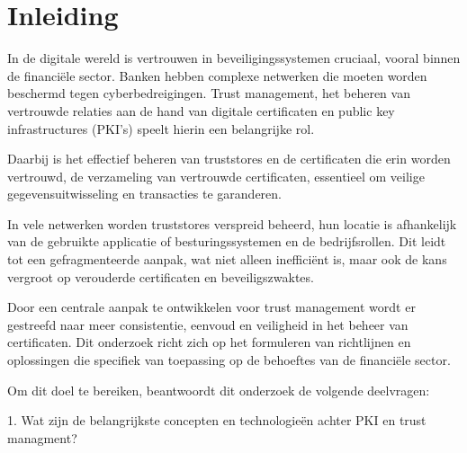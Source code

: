 


% 

\section{Inleiding}%
\label{sec:inleiding}

In de digitale wereld is vertrouwen in beveiligingssystemen cruciaal, vooral binnen de financiële sector. Banken hebben complexe netwerken die moeten worden beschermd tegen cyberbedreigingen. Trust management, het beheren van vertrouwde relaties aan de hand van digitale certificaten en public key infrastructures (PKI's) speelt hierin een belangrijke rol.

Daarbij is het effectief beheren van truststores en de certificaten die erin worden vertrouwd, de verzameling van vertrouwde certificaten, essentieel om veilige gegevensuitwisseling en transacties te garanderen.

In vele netwerken worden truststores verspreid beheerd, hun locatie is afhankelijk van de gebruikte applicatie of besturingssystemen en de bedrijfsrollen. Dit leidt tot een gefragmenteerde aanpak, wat niet alleen inefficiënt is, maar ook de kans vergroot op verouderde certificaten en beveiligszwaktes.

Door een centrale aanpak te ontwikkelen voor trust management wordt er gestreefd naar meer consistentie, eenvoud en veiligheid in het beheer van certificaten. Dit onderzoek richt zich op het formuleren van richtlijnen en oplossingen die specifiek van toepassing op de behoeftes van de financiële sector.

Om dit doel te bereiken, beantwoordt dit onderzoek de volgende deelvragen:

1. Wat zijn de belangrijkste concepten en technologieën achter PKI en trust managment?


